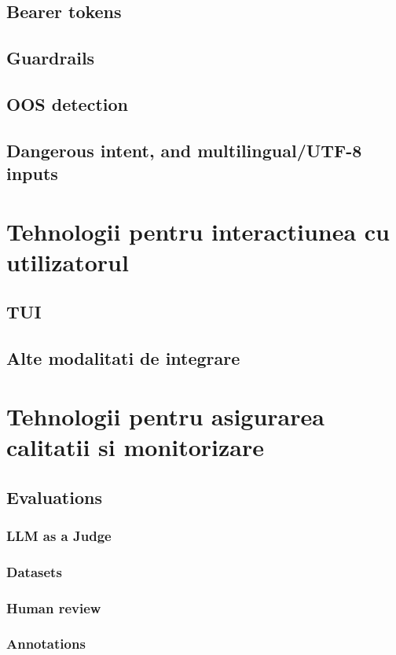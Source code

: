 \documentclass[12pt, a4paper, oneside, romanian, draft]{teza-upb}
\begin{document}
    \subsection{Bearer tokens}
    \subsection{Guardrails}
    \subsection{OOS detection}
    \subsection{Dangerous intent, and multilingual/UTF-8 inputs}


  \section{Tehnologii pentru interactiunea cu utilizatorul}
    
    \subsection{TUI}
    \subsection{Alte modalitati de integrare}


  \section{Tehnologii pentru asigurarea calitatii si monitorizare}
    \subsection{Evaluations}
      \subsubsection{LLM as a Judge}
      \subsubsection{Datasets}
      \subsubsection{Human review}
      \subsubsection{Annotations}
\end{document}
